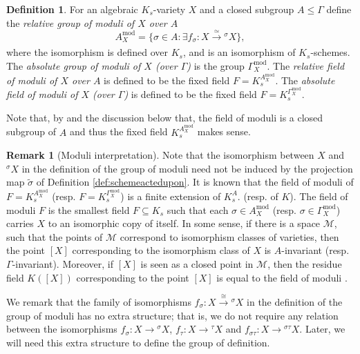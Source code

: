 \documentclass[10pt]{amsart}
\theoremstyle{definition}
\newtheorem{remark}[theorem]{Remark}
\newtheorem{definition}[theorem]{Definition}
\begin{document}
\begin{definition}
  \label{def:groupModuliArAA}
For an algebraic $K_s$-variety $X$ and a closed subgroup $A \leq \mathfrak{\Gamma}$ define the {\em relative group of moduli of $X$ over $A$}
\[
  A_X^{\mathrm{mod}} = \{ 
\sigma \in A : \exists f_{\sigma} \colon X \xrightarrow[]{\simeq}   {^\sigma \! X} \} ,
\]
where the isomorphism is defined over  $K_s$, and is an isomorphism of $K_s$-schemes. 
The {\em absolute group of moduli of $X$ (over $\mathfrak{\Gamma}$)} is the group $\mathfrak{\Gamma}_X^{\mathrm{mod}}$. \newline
The {\em relative field of moduli of $X$ over $A$} is defined to be the fixed field $F=K_s^{A_X^{\mathrm{mod}}}$. 
The {\em absolute field of moduli of $X$ (over $\mathfrak{\Gamma}$)} is defined to be the fixed field $F=K_s^{\mathfrak{\Gamma}_X^{\mathrm{mod}}}$.
\end{definition}


Note that, by \cite[Proposition 2.1]{DebesEmsalem} and the discussion below that, the field of moduli is a closed subgroup of $A$ and thus the fixed field $K_s^{A_X^{\mathrm{mod}}}$ makes sense.


\begin{remark}[Moduli interpretation]
 Note that the isomorphism between $X$ and ${^\sigma \! X}$ in the definition of the group of moduli need not be induced by the projection map $\tilde{\sigma}$ of Definition \ref{def:schemeactedupon}.
 It is known that the 
 field of moduli of $F=K_s^{A_X^{\mathrm{mod}}}$ (resp. $F=K_s^{\mathfrak{\Gamma}_X^{\mathrm{mod}}}$) is a finite extension of $K_s^A$. (resp. of $K$).
The field of moduli $F$ is the smallest field $F \subseteq K_s$ such that each $\sigma \in A_X^{\mathrm{mod}}$ (resp. $\sigma \in \mathfrak{\Gamma}_X^{\mathrm{mod}}$) carries $X$ to an isomorphic copy of itself.  
In some sense, if there is a space $\mathcal{M}$, such that the points of $\mathcal{M}$ correspond to isomorphism classes of varieties, then the point $[X]$ corresponding to the isomorphism class of $X$ is $A$-invariant (resp. $\mathfrak{\Gamma}$-invariant).
Moreover, if $[X]$ is seen as a closed point in $\mathcal{M}$, then the residue field $K([X])$ corresponding to the point $[X]$ is equal to the field of moduli \cite{MR0162799}.
\end{remark}

We remark that the family of isomorphisms $f_\sigma \colon  X \stackrel{\cong}{\longrightarrow}  {^\sigma \! X}$ in the definition of the group of moduli has no extra structure; that is, we do not require any relation between the isomorphisms 
$f_\sigma\colon X  \to {^\sigma \! X}$, 
$f_\tau \colon X \to  {^\tau \! X}$ 
and 
$f_{\sigma\tau} \colon X \to { ^{\sigma\tau} \!X}$.
Later, we will need this extra structure to define the group of definition.
\end{document}
